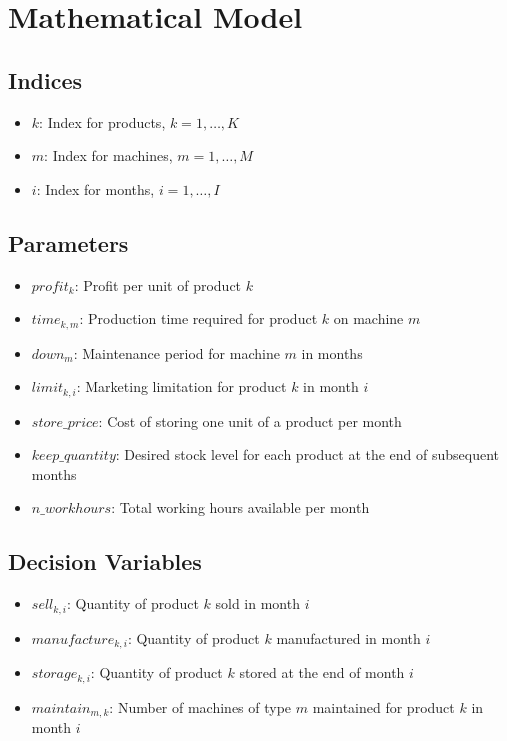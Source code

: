 \documentclass{article}
\begin{document}
\section*{Mathematical Model}

\subsection*{Indices}
\begin{itemize}
    \item $k$: Index for products, $k = 1, \ldots, K$
    \item $m$: Index for machines, $m = 1, \ldots, M$
    \item $i$: Index for months, $i = 1, \ldots, I$
\end{itemize}

\subsection*{Parameters}
\begin{itemize}
    \item $profit_k$: Profit per unit of product $k$
    \item $time_{k,m}$: Production time required for product $k$ on machine $m$
    \item $down_m$: Maintenance period for machine $m$ in months
    \item $limit_{k,i}$: Marketing limitation for product $k$ in month $i$
    \item $store\_price$: Cost of storing one unit of a product per month
    \item $keep\_quantity$: Desired stock level for each product at the end of subsequent months
    \item $n\_workhours$: Total working hours available per month
\end{itemize}

\subsection*{Decision Variables}
\begin{itemize}
    \item $sell_{k,i}$: Quantity of product $k$ sold in month $i$
    \item $manufacture_{k,i}$: Quantity of product $k$ manufactured in month $i$
    \item $storage_{k,i}$: Quantity of product $k$ stored at the end of month $i$
    \item $maintain_{m,k}$: Number of machines of type $m$ maintained for product $k$ in month $i$
\end{itemize}
\end{document}
